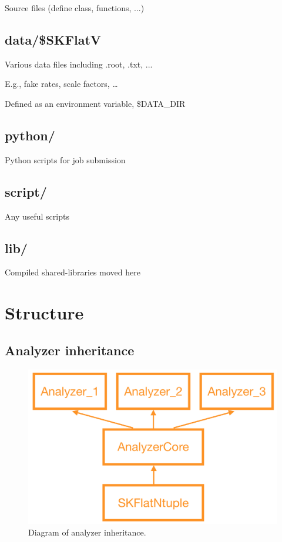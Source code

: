 \documentclass[12pt, a4paper, titlepage]{article}
\begin{document}
Source files (define class, functions, ...)

\subsection{data/\$SKFlatV}

Various data files including .root, .txt, ...

E.g., fake rates, scale factors, …

Defined as an environment variable, \$DATA\_DIR

\subsection{python/}

Python scripts for job submission

\subsection{script/}

Any useful scripts

\subsection{lib/}

Compiled shared-libraries moved here

\clearpage

\section{Structure}

\subsection{Analyzer inheritance}

\begin{figure}[htbp]
\centering
  \includegraphics[width=1.0\textwidth]{Figures/AnalyzerInheritance.png}
  \caption{
    Diagram of analyzer inheritance.
  }
\end{figure}
\end{document}
